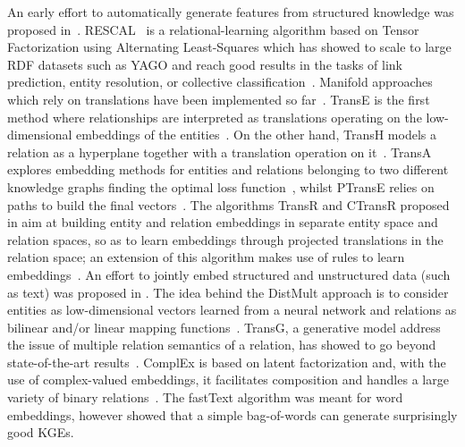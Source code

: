 \documentclass[graybox]{archivesofdatascience}
\begin{document}
An early effort to automatically generate features from structured knowledge was proposed in~\citep{cheng2011automated}.
RESCAL~\citep{nickel2011three} is a relational-learning algorithm based on Tensor Factorization using Alternating Least-Squares which has showed to scale to large RDF datasets such as YAGO\citep{nickel2012factorizing} and reach good results in the tasks of link prediction, entity resolution, or collective classification~\citep{nickel2014reducing}.
Manifold approaches which rely on translations have been implemented so far~\citep{TransE/bordes2013translating,TransH/wang2014knowledge,TransA/jia2015locally,TransR/lin2015learning,TransRrules/wang2015knowledge,TransG/xiao2015transg}. 
TransE is the first method where relationships are interpreted as translations operating on the low-dimensional embeddings of the entities~\citep{TransE/bordes2013translating}.
On the other hand, TransH models a relation as a hyperplane together with a translation operation on it~\citep{TransH/wang2014knowledge}.
TransA explores embedding methods for entities and relations belonging to two different knowledge graphs finding the optimal loss function~\citep{TransA/jia2015locally}, whilst PTransE relies on paths to build the final vectors~\citep{PTransE/DBLP:journals/corr/LinLS15}.
The algorithms TransR and CTransR proposed in \cite{TransR/lin2015learning} aim at building entity and relation embeddings in separate entity space and relation spaces, so as to learn embeddings through projected translations in the relation space;
an extension of this algorithm makes use of rules to learn embeddings~\citep{TransRrules/wang2015knowledge}.
An effort to jointly embed structured and unstructured data (such as text) was proposed in \cite{KGtext/wang2014knowledge}.
The idea behind the DistMult approach is to consider entities as low-dimensional vectors learned from a neural network and relations as bilinear and/or linear mapping functions~\cite{yang2014embedding}.
TransG, a generative model address the issue of multiple relation semantics of a relation, has showed to go beyond state-of-the-art results~\citep{TransG/xiao2015transg}.
ComplEx is based on latent factorization and, with the use of complex-valued embeddings, it facilitates composition and handles a large variety of binary relations~\cite{trouillon2016complex}.
The fastText algorithm was meant for word embeddings, however \cite{joulin2017fast} showed that a simple bag-of-words can generate surprisingly good KGEs.
\end{document}

